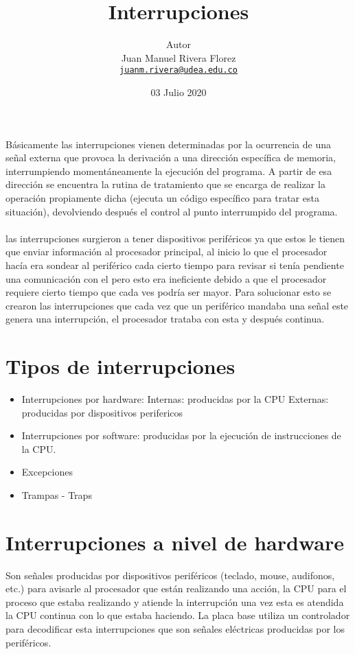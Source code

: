 \documentclass[11pt]{article}
\title{Interrupciones}
\author{{\Large Autor}\\Juan Manuel Rivera Florez\\
        \href{mailto:juanm.rivera@udea.edu.co}{\texttt{juanm.rivera@udea.edu.co}}}
\date{03 Julio 2020}
\begin{document}
\maketitle


%
Básicamente las interrupciones vienen determinadas por la ocurrencia de una señal externa que provoca la derivación a una dirección específica de memoria, interrumpiendo momentáneamente la ejecución del programa. A partir de esa dirección se encuentra la rutina de tratamiento que se encarga de realizar la operación propiamente dicha (ejecuta un código específico para tratar esta situación), devolviendo después el control al punto interrumpido del programa. 
%
\\
\\
%
las interrupciones surgieron a tener dispositivos periféricos  ya que estos le tienen que enviar información al procesador principal, al inicio lo que el procesador hacía era sondear al periférico cada cierto tiempo para revisar si tenía pendiente una comunicación con el pero esto era ineficiente debido a que el procesador requiere cierto tiempo que cada ves podría ser mayor. Para solucionar esto se crearon las interrupciones que cada vez que un periférico mandaba una señal este genera una interrupción, el procesador trataba con esta y después continua.
%
\section*{Tipos de interrupciones}
%

\begin{itemize}
    \item Interrupciones por hardware:
    \subitem Internas: producidas por la CPU
    \subitem Externas: producidas por dispositivos perifericos
    \item Interrupciones por software: producidas por la ejecución de instrucciones de la CPU.
    \item Excepciones 
    \item Trampas - Traps
\end{itemize}
%
\section*{Interrupciones a nivel de hardware}

Son señales producidas por dispositivos periféricos (teclado, mouse, audifonos, etc.) para avisarle al procesador que están realizando una acción, la CPU para el proceso que estaba realizando y atiende la interrupción una vez esta es atendida la  CPU continua con lo que estaba haciendo. La placa base utiliza un controlador para decodificar esta interrupciones que son señales eléctricas producidas por los periféricos. 
%
\end{document}
